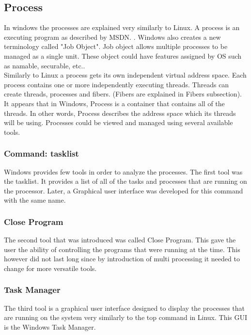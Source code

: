 \documentclass[journal,10pt,onecolumn,compsoc,letterpaper,draftclsnofoot,table,xcdraw]{IEEEtran} \usepackage[margin=0.75in]{geometry}
\begin{document}
\subsection{Process}
\noindent In windows the processes are explained very similarly to Linux. A process is an executing program as described by MSDN. \cite{msdnprocess}. Windows also creates a new terminology called "Job Object". Job object allows multiple processes to be managed as a single unit. These object could have features assigned by OS such as namable, securable, etc.\cite{msdnprocess}. \\
\noindent Similarly to Linux a process gets its own independent virtual address space. Each process contains one or more independently executing threads. Threads can create threads, processes and fibers. (Fibers are explained in Fibers subsection). It appears that in Windows, Process is a container that contains all of the threads. In other words, Process describes the address space which its threads will be using. Processes could be viewed and managed using several available tools.
\subsubsection{Command: tasklist}
\noindent Windows provides few tools in order to analyze the processes. The first tool was the tasklist. It provides a list of all of the tasks and processes that are running on the processor. Later, a Graphical user interface was developed for this command with the same name.
\subsubsection{Close Program}
\noindent The second tool that was introduced was called Close Program. This gave the user the ability of controlling the programs that were running at the time. This however did not last long since by introduction of multi processing it needed to change for more versatile tools.
\subsubsection{Task Manager}
\noindent The third tool is a graphical user interface designed to display the processes that are running on the system very similarly to the top command in Linux. This GUI is the Windows Task Manager. 
\end{document}
